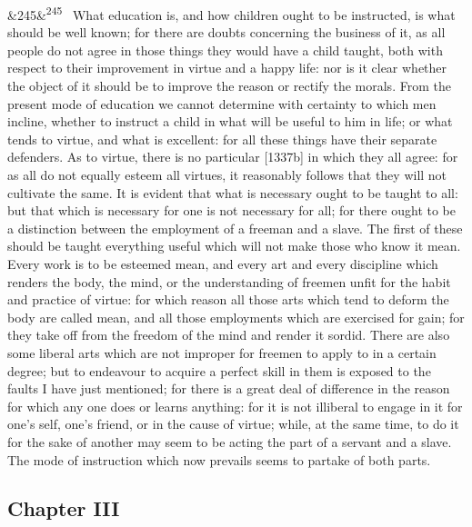 \documentclass[12pt]{article}
\newcommand{\para}[1][]{\par\noindent\ifx&#1&\else\textsuperscript{\footnotesize #1}~\fi}
\begin{document}
\para[245] What education is, and how children ought to be instructed, is what should be well known; for there are doubts concerning the business of it, as all people do not agree in those things they would have a child taught, both with respect to their improvement in virtue and a happy life: nor is it clear whether the object of it should be to improve the reason or rectify the morals. From the present mode of education we cannot determine with certainty to which men incline, whether to instruct a child in what will be useful to him in life; or what tends to virtue, and what is excellent: for all these things have their separate defenders. As to virtue, there is no particular [1337b] in which they all agree: for as all do not equally esteem all virtues, it reasonably follows that they will not cultivate the same. It is evident that what is necessary ought to be taught to all: but that which is necessary for one is not necessary for all; for there ought to be a distinction between the employment of a freeman and a slave. The first of these should be taught everything useful which will not make those who know it mean. Every work is to be esteemed mean, and every art and every discipline which renders the body, the mind, or the understanding of freemen unfit for the habit and practice of virtue: for which reason all those arts which tend to deform the body are called mean, and all those employments which are exercised for gain; for they take off from the freedom of the mind and render it sordid. There are also some liberal arts which are not improper for freemen to apply to in a certain degree; but to endeavour to acquire a perfect skill in them is exposed to the faults I have just mentioned; for there is a great deal of difference in the reason for which any one does or learns anything: for it is not illiberal to engage in it for one's self, one's friend, or in the cause of virtue; while, at the same time, to do it for the sake of another may seem to be acting the part of a servant and a slave. The mode of instruction which now prevails seems to partake of both parts.

\subsection*{Chapter III}
\end{document}
